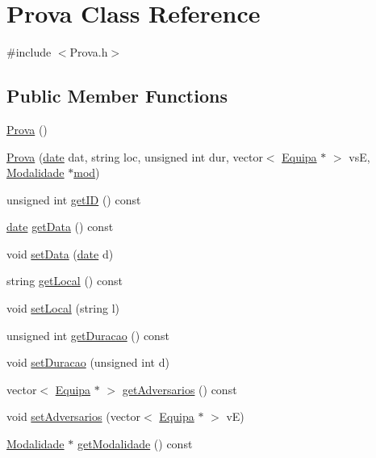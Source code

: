\hypertarget{class_prova}{}\section{Prova Class Reference}
\label{class_prova}


{\ttfamily \#include $<$Prova.\+h$>$}

\subsection*{Public Member Functions}
\begin{DoxyCompactItemize}
\item 
\hyperlink{class_prova_a4f36eaf2032327c06f7f7accd1ff7359}{Prova} ()
\item 
\hyperlink{class_prova_ab7713d18e28afa59ab2f106ec125d065}{Prova} (\hyperlink{structdate}{date} dat, string loc, unsigned int dur, vector$<$ \hyperlink{class_equipa}{Equipa} $\ast$ $>$ vs\+E, \hyperlink{class_modalidade}{Modalidade} $\ast$\hyperlink{class_prova_a9a372fdc63a673192aca93e5b3cdba22}{mod})
\item 
unsigned int \hyperlink{class_prova_a012b548cc9df64e2d43e59091796602f}{get\+I\+D} () const 
\item 
\hyperlink{structdate}{date} \hyperlink{class_prova_a88e20574edda3295f8dca8a06028348b}{get\+Data} () const 
\item 
void \hyperlink{class_prova_ad7b16cc7b4e09c0f0a149d3096eb66d4}{set\+Data} (\hyperlink{structdate}{date} d)
\item 
string \hyperlink{class_prova_a032f33dd9c442edda490029fff463898}{get\+Local} () const 
\item 
void \hyperlink{class_prova_a1d86cb87877a9dcaf3858078b12a4a7d}{set\+Local} (string l)
\item 
unsigned int \hyperlink{class_prova_aea1d2198c70bb49385f716df2addf7ae}{get\+Duracao} () const 
\item 
void \hyperlink{class_prova_addc2d33d4b2ef9ec2c7dfa66cefed083}{set\+Duracao} (unsigned int d)
\item 
vector$<$ \hyperlink{class_equipa}{Equipa} $\ast$ $>$ \hyperlink{class_prova_a015e691c4fa50bb756adced9cdc30eb7}{get\+Adversarios} () const 
\item 
void \hyperlink{class_prova_af805f91c0039ade3b1bab2ab0b43e592}{set\+Adversarios} (vector$<$ \hyperlink{class_equipa}{Equipa} $\ast$ $>$ v\+E)
\item 
\hyperlink{class_modalidade}{Modalidade} $\ast$ \hyperlink{class_prova_afbf918fbf8ddfd7a2b3785af51536e25}{get\+Modalidade} () const 

\end{DoxyCompactItemize}
